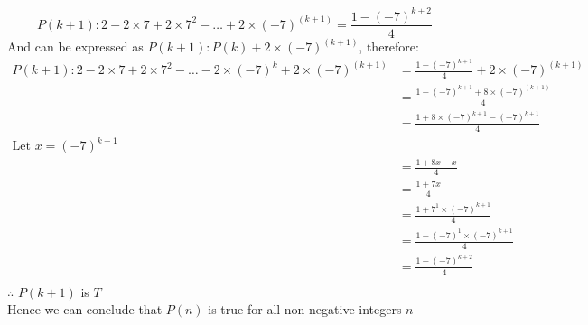 \documentclass[12pt letter]{report}
\begin{document}
\begin{myproof}
  \[
    P \left( k + 1 \right): 2 - 2\times 7 + 2 \times 7^2 - \ldots + 2 \times \left( - 7 \right)^{\left( k + 1 \right) } =
    \frac{1 - \left( -7 \right)^{k + 2} }{4}
  \]
  And can be expressed as $P \left( k + 1 \right): P \left( k \right) + 2\times \left( -7 \right)^{\left( k + 1 \right)
    }   $, therefore:
  \begin{align*}
    P \left( k + 1 \right): 2 - 2\times 7 + 2 \times 7^2 - \ldots - 2 \times \left( -7 \right)^{k}  + 2 \times \left( -
    7 \right)^{\left( k + 1 \right) } & = \frac{1 - \left( - 7 \right)^{k + 1} }{4} + 2 \times \left( -7 \right)^{\left( k +
    1 \right) }                                                                                                                           \\
                                      & = \frac{1 - \left( - 7 \right)^{k + 1} + 8 \times \left( -7 \right)^{\left( k + 1 \right) }  }{4} \\
                                      & = \frac{1 + 8 \times  \left( - 7  \right)^{k + 1} - \left( -7 \right)^{k + 1}  }{4}               \\
    \text{Let } x = \left( -7 \right)^{k + 1}                                                                                             \\
                                      & = \frac{1 + 8x - x}{4}                                                                            \\
                                      & = \frac{1 + 7x}{4}                                                                                \\
                                      & = \frac{1 + 7^{1}\times \left( -7 \right)^{k + 1} }{4}                                            \\
                                      & = \frac{1 - \left( -7 \right)^{1} \times \left( - 7 \right)^{k + 1}   }{4}                        \\
                                      & = \frac{1- \left( -7 \right)^{k + 2} }{4}                                                         \\
  \end{align*}
  $\therefore$ $P \left( k + 1 \right) $ is $T$ \\
  Hence we can conclude that $P \left( n \right) $ is true for all non-negative integers $n$


\end{myproof}
\end{document}

